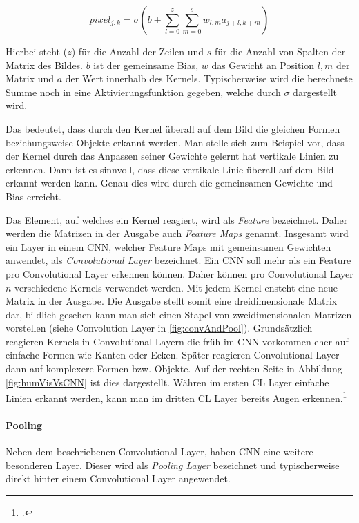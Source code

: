 \begin{equation}
    \label{eq:actSharedWeights}
    pixel_{j,k} = \sigma\left(b+\sum_{l=0}^{z} \sum_{m=0}^{s} w_{l, m} a_{j+l, k+m}\right)
\end{equation}

Hierbei steht ($z$) für die Anzahl der Zeilen und $s$ für die Anzahl von Spalten der Matrix des Bildes. $b$ ist der gemeinsame Bias, $w$ das Gewicht an Position $l,m$ der Matrix und $a$ der Wert innerhalb des Kernels. Typischerweise wird die berechnete Summe noch in eine Aktivierungsfunktion gegeben, welche durch $\sigma$ dargestellt wird.

Das bedeutet, dass durch den Kernel überall auf dem Bild die gleichen Formen beziehungsweise Objekte erkannt werden. Man stelle sich zum Beispiel vor, dass der Kernel durch das Anpassen seiner Gewichte gelernt hat vertikale Linien zu erkennen. Dann ist es sinnvoll, dass diese vertikale Linie überall auf dem Bild erkannt werden kann. Genau dies wird durch die gemeinsamen Gewichte und Bias erreicht.

Das Element, auf welches ein Kernel reagiert, wird als \textit{Feature} bezeichnet. Daher werden die Matrizen in der Ausgabe auch \textit{Feature Maps} genannt. Insgesamt wird ein Layer in einem \ac{CNN}, welcher Feature Maps mit gemeinsamen Gewichten anwendet, als \textit{Convolutional Layer} bezeichnet. Ein \ac{CNN} soll mehr als ein Feature pro Convolutional Layer erkennen können. Daher können pro Convolutional Layer $n$ verschiedene Kernels verwendet werden. Mit jedem Kernel ensteht eine neue Matrix in der Ausgabe. Die Ausgabe stellt somit eine dreidimensionale Matrix dar, bildlich gesehen kann man sich einen Stapel von zweidimensionalen Matrizen vorstellen (siehe Convolution Layer in \ref{fig:convAndPool}).
Grundsätzlich reagieren Kernels in Convolutional Layern die früh im \ac{CNN} vorkommen eher auf einfache Formen wie Kanten oder Ecken. Später reagieren Convolutional Layer dann auf komplexere Formen bzw. Objekte. Auf der rechten Seite in Abbildung \ref{fig:humVisVsCNN} ist dies dargestellt. Währen im ersten CL Layer einfache Linien erkannt werden, kann man im dritten CL Layer bereits Augen erkennen.\footcite[Vgl.][S. 169-171]{nielsenNeuralNetworksDeep2015}

\paragraph{Pooling}
Neben dem beschriebenen Convolutional Layer, haben \ac{CNN} eine weitere besonderen Layer. Dieser wird als \textit{Pooling Layer} bezeichnet und typischerweise direkt hinter einem Convolutional Layer angewendet. 

